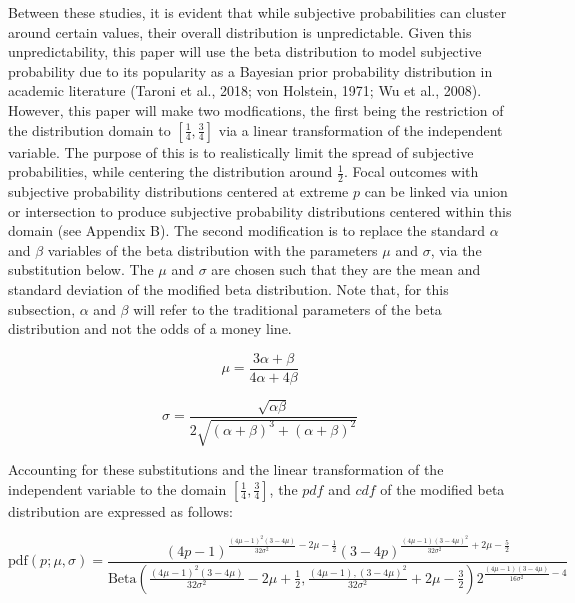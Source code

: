 \documentclass[sn-mathphys-num]{sn-jnl}
\theoremstyle{thmstyleone}%
\theoremstyle{thmstyletwo}%
\theoremstyle{thmstylethree}%
\begin{document}
Between these studies, it is evident that while subjective probabilities can cluster around certain values, their overall distribution is unpredictable. Given this unpredictability, this paper will use the beta distribution to model subjective probability due to its popularity as a Bayesian prior probability distribution in academic literature (Taroni et al., 2018; von Holstein, 1971; Wu et al., 2008). However, this paper will make two modfications, the first being the restriction of the distribution domain to $[\frac{1}{4}, \frac{3}{4}]$ via a linear transformation of the independent variable. The purpose of this is to realistically limit the spread of subjective probabilities, while centering the distribution around $\frac{1}{2}$. Focal outcomes with subjective probability distributions centered at extreme $p$ can be linked via union or intersection to produce subjective probability distributions centered within this domain (see Appendix B). The second modification is to replace the standard $\alpha$ and $\beta$ variables of the beta distribution with the parameters $\mu$ and $\sigma$, via the substitution below. The $\mu$ and $\sigma$ are chosen such that they are the mean and standard deviation of the modified beta distribution. Note that, for this subsection, $\alpha$ and $\beta$ will refer to the traditional parameters of the beta distribution and not the odds of a money line. 

\begin{equation}
\mu = \frac{3\alpha+\beta}{4\alpha+4\beta}
\end{equation}

\begin{equation}
\sigma = \frac{\sqrt{\alpha \beta}}{2\sqrt{(\alpha+\beta)^3 + (\alpha+\beta)^2}}
\end{equation}
\vspace{.05in}

Accounting for these substitutions and the linear transformation of the independent variable to the domain $[\frac{1}{4}, \frac{3}{4}]$, the $pdf$ and $cdf$ of the modified beta distribution are expressed as follows:

\begin{equation}
\textrm{pdf}(p;\mu,\sigma) = \frac{(4p-1)^{\frac{(4\mu-1)^2(3-4\mu)}{32\sigma^2}-2\mu-\frac{1}{2}} (3-4p)^{\frac{(4\mu-1)(3-4\mu)^2}{32\sigma^2}+2\mu-\frac{5}{2}}}{\textrm{Beta}(\frac{(4\mu-1)^2(3-4\mu)}{32\sigma^2}-2\mu+\frac{1}{2},\frac{(4\mu-1), (3-4\mu)^2}{32\sigma^2}+2\mu-\frac{3}{2})  2^{\frac{(4\mu-1)(3-4\mu)}{16\sigma^2}-4}}
\end{equation}
\vspace{.05in}
\end{document}
